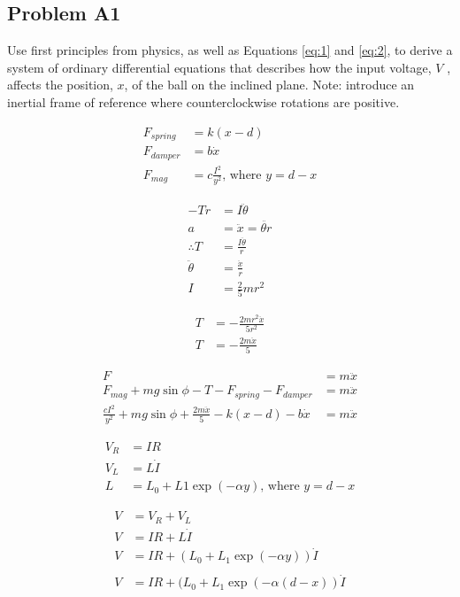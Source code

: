\subsection{Problem A1}\label{sec:q1} Use first principles from physics, as well as Equations \eqref{eq:1} and \eqref{eq:2}, to derive a system of ordinary differential equations that describes how the input voltage, \(V\) , affects the position, \(x\), of the ball on the inclined plane. Note: introduce an inertial frame of reference where counterclockwise rotations are positive.
    
    \begin{align}
        F_{spring} &= k(x - d)\\
        F_{damper} &= b\dot{x}\\
        F_{mag} &= c \frac{I^2}{y^2} \text{, where } y = d - x
    \end{align}

    \begin{align}
        -Tr &= I\ddot{\theta}\\
        a &= \ddot{x} = \ddot{\theta r}\\
        \therefore T &= \frac{I \ddot{\theta}}{r}\\
        \ddot{\theta} &= \frac{\ddot{x}}{r}\\
        I &= \frac{2}{5} mr^2
    \end{align}
    
    \begin{align}
        T &= - \frac{2mr^2 \ddot{x}}{5r^2} \nonumber \\
        T &= - \frac{2m \ddot{x}}{5}
    \end{align}
    
    \begin{align}
        F &= m \ddot{x} \nonumber \\
        F_{mag} + mg \sin{\phi} - T - F_{spring} - F_{damper} &= m \ddot{x} \nonumber \\
        \frac{cI^2}{y^2} + mg \sin{\phi} + \frac{2m \ddot{x}}{5} - k(x - d) - b \dot{x} &= m \ddot{x}
    \end{align}
    
    \begin{align}
        V_{R} &= IR\\
        V_{L} &= L \dot{I}\\
        L &= L_{0} + L{1} \exp(- \alpha y) \text{, where } y = d - x
    \end{align}
    
    \begin{align}
        V &= V_{R} + V_{L} \nonumber \\
        V &= IR + L \dot{I} \nonumber \\
        V &= IR + (L_{0} + L_{1} \exp(- \alpha y)) \dot{I} \nonumber \\
        \nonumber \\
        V &= IR + (L_{0} + L_{1} \exp(- \alpha (d - x))\dot{I}
    \end{align}
    
